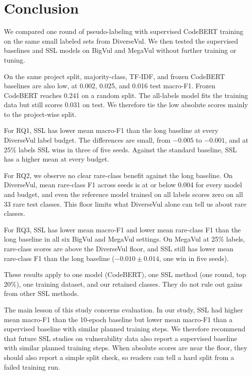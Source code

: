 \documentclass[conference]{IEEEtran}
\begin{document}
\section{Conclusion}\label{conclusion}

We compared one round of pseudo-labeling with supervised CodeBERT
training on the same small labeled sets from DiverseVul. We then tested
the supervised baselines and SSL models on BigVul and MegaVul without
further training or tuning.

On the same project split, majority-class, TF-IDF, and frozen CodeBERT baselines are also low, at 0.002, 0.025, and 0.016 test macro-F1. Frozen CodeBERT reaches 0.241 on a random split. The all-labels model fits the training data but still scores 0.031 on test. We therefore tie the low absolute scores mainly to the project-wise split.

For RQ1, SSL has lower mean macro-F1 than the long baseline at every
DiverseVul label budget. The differences are small, from \(-0.005\) to
\(-0.001\), and at 25\% labels SSL wins in three of five seeds. Against
the standard baseline, SSL has a higher mean at every budget.

For RQ2, we observe no clear rare-class benefit against the long
baseline. On DiverseVul, mean rare-class F1 across seeds is at or below
0.004 for every model and budget, and even the reference model trained
on all labels scores zero on all 33 rare test classes. This floor limits
what DiverseVul alone can tell us about rare classes.

For RQ3, SSL has lower mean macro-F1 and lower mean rare-class F1 than
the long baseline in all six BigVul and MegaVul settings. On MegaVul at
25\% labels, rare-class scores are above the DiverseVul floor, and SSL
still has lower mean rare-class F1 than the long baseline
(\(-0.010\pm0.014\), one win in five seeds).

These results apply to one model (CodeBERT), one SSL method (one round,
top 20\%), one training dataset, and our retained classes. They do not
rule out gains from other SSL methods.

The main lesson of this study concerns evaluation. In our study, SSL had
higher mean macro-F1 than the 10-epoch baseline but lower mean macro-F1
than a supervised baseline with similar planned training steps. We
therefore recommend that future SSL studies on vulnerability data also
report a supervised baseline with similar planned training steps.
When absolute scores are near the floor, they should also report a simple split check, so readers can tell a hard split from a failed training run.



\end{document}
